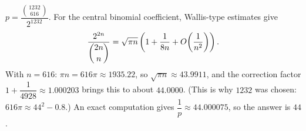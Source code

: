 $p=\dfrac{\binom{1232}{616}}{2^{1232}}$. For the central binomial coefficient, Wallis-type estimates give
\[
\dfrac{2^{2n}}{\dbinom{2n}{n}}=\sqrt{\pi n}\left(1+\dfrac{1}{8n}+O\!\left(\dfrac{1}{n^2}\right)\right).
\]
With $n=616$: $\pi n=616\pi\approx1935.22$, so $\sqrt{\pi n}\approx43.9911$, and the correction factor $1+\dfrac{1}{4928}\approx1.000203$ brings this to about $44.0000$. (This is why $1232$ was chosen: $616\pi\approx44^2-0.8$.) An exact computation gives $\dfrac{1}{p}\approx44.000075$, so the answer is $\boxed{44}$.
